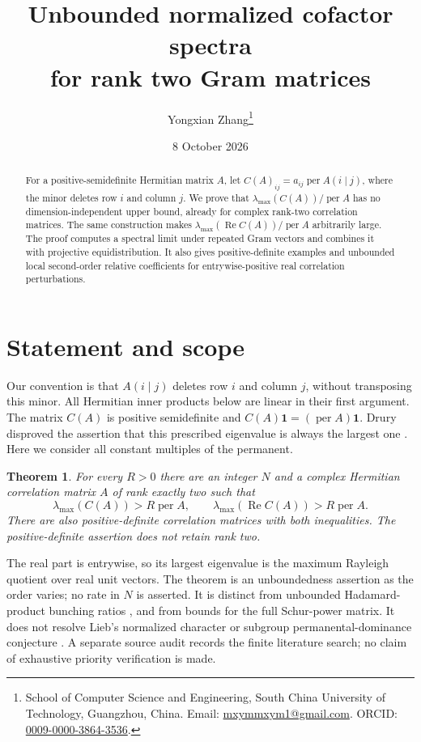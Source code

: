\documentclass[11pt]{article}
\title{Unbounded normalized cofactor spectra\\for rank two Gram matrices}
\author{Yongxian Zhang\thanks{School of Computer Science and Engineering,
South China University of Technology, Guangzhou, China.
Email: \href{mailto:mxymmxym1@gmail.com}{mxymmxym1@gmail.com}.
ORCID: \href{https://orcid.org/0009-0000-3864-3536}{0009-0000-3864-3536}.}}
\date{8 October 2026}
\newtheorem{theorem}{Theorem}
\DeclareMathOperator{\per}{per}
\DeclareMathOperator{\Ree}{Re}
\newcommand{\one}{\mathbf 1}
\begin{document}
\maketitle
\begin{abstract}
For a positive-semidefinite Hermitian matrix $A$, let
$C(A)_{ij}=a_{ij}\per A(i\mid j)$, where the minor deletes row $i$ and column $j$.
We prove that $\lambda_{\max}(C(A))/\per A$ has no dimension-independent upper bound,
already for complex rank-two correlation matrices. The same construction makes
$\lambda_{\max}(\Ree C(A))/\per A$ arbitrarily large. The proof computes a spectral
limit under repeated Gram vectors and combines it with projective equidistribution.
It also gives positive-definite examples and unbounded local second-order relative
coefficients for entrywise-positive real correlation perturbations.
\end{abstract}

\section{Statement and scope}
Our convention is that $A(i\mid j)$ deletes row $i$ and column $j$, without
transposing this minor. All Hermitian inner products below are linear in their
first argument. The matrix $C(A)$ is positive semidefinite and
$C(A)\one=(\per A)\one$. Drury disproved the assertion that this prescribed
eigenvalue is always the largest one \cite{drury}. Here we consider all constant
multiples of the permanent.

\begin{theorem}\label{thm:main}
For every $R>0$ there are an integer $N$ and a complex Hermitian correlation
matrix $A$ of rank exactly two such that
\[
 \lambda_{\max}(C(A))>R\per A,
 \qquad \lambda_{\max}(\Ree C(A))>R\per A.
\]
There are also positive-definite correlation matrices with both inequalities.
The positive-definite assertion does not retain rank two.
\end{theorem}

The real part is entrywise, so its largest eigenvalue is the maximum Rayleigh
quotient over real unit vectors. The theorem is an unboundedness assertion as
the order varies; no rate in $N$ is asserted. It is distinct from unbounded
Hadamard-product bunching ratios \cite{seron}, and from bounds for the full
Schur-power matrix. It does not resolve Lieb's normalized character or subgroup
permanental-dominance conjecture \cite{wanless}. A separate source audit records
the finite literature search; no claim of exhaustive priority verification is made.
\end{document}
